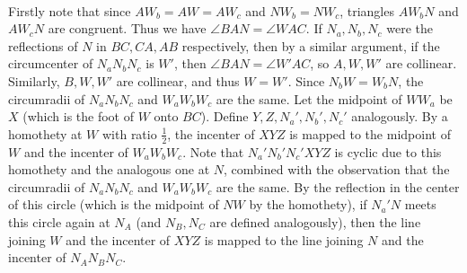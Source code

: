 \begin{center}
\\
\end{center}
Firstly note that since $AW_b = AW = AW_c$ and $NW_b = NW_c$, triangles $AW_bN$ and $AW_cN$ are congruent. Thus we have $\angle BAN = \angle WAC$. If $N_a, N_b, N_c$ were the reflections of $N$ in $BC, CA, AB$ respectively, then by a similar argument, if the circumcenter of $N_aN_bN_c$ is $W'$, then $\angle BAN = \angle W'AC$, so $A, W, W'$ are collinear. Similarly, $B, W, W'$ are collinear, and thus $W = W'$.\nl
Since $N_bW = W_bN$, the circumradii of $N_aN_bN_c$ and $W_aW_bW_c$ are the same. Let the midpoint of $WW_a$ be $X$ (which is the foot of $W$ onto $BC$). Define $Y, Z, N_a', N_b', N_c'$ analogously. By a homothety at $W$ with ratio $\frac{1}{2}$, the incenter of $XYZ$ is mapped to the midpoint of $W$ and the incenter of $W_aW_bW_c$. Note that $N_a'N_b'N_c'XYZ$ is cyclic due to this homothety and the analogous one at $N$, combined with the observation that the circumradii of $N_aN_bN_c$ and $W_aW_bW_c$ are the same. By the reflection in the center of this circle (which is the midpoint of $NW$ by the homothety), if $N_a'N$ meets this circle again at $N_A$ (and $N_B, N_C$ are defined analogously), then the line joining $W$ and the incenter of $XYZ$ is mapped to the line joining $N$ and the incenter of $N_AN_BN_C$.\nl
